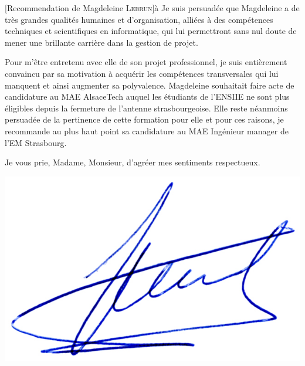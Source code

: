 \documentclass[a4paper,10pt]{article}
\begin{document}
\begin{letter}[Recommendation de Magdeleine \textsc{Lebrun}]{à}
Je suis persuadée que Magdeleine a de très grandes qualités humaines et
d'organisation, alliées à des compétences techniques et scientifiques en
informatique, qui lui permettront sans nul doute de mener une brillante
carrière dans la gestion de projet.

Pour m'être entretenu  avec elle de son projet professionnel,  je suis entièrement
convaincu par  sa motivation  à acquérir les  compétences transversales  qui lui
manquent et ainsi augmenter sa polyvalence.  Magdeleine souhaitait faire acte de
candidature au MAE AlsaceTech auquel les étudiants de l'ENSIIE ne sont plus
éligibles depuis la fermeture de l'antenne strasbourgeoise. Elle reste néanmoins
persuadée de la pertinence de cette formation pour elle et pour ces raisons, je recommande au
plus haut point sa candidature au  MAE Ingénieur manager de l'EM Strasbourg.


Je vous prie, Madame, Monsieur, d'agréer mes sentiments respectueux.

\end{letter}
\begin{flushright}
\includegraphics[width=.2\textwidth]{signgenaud.jpg}
\end{flushright}
\end{document}

